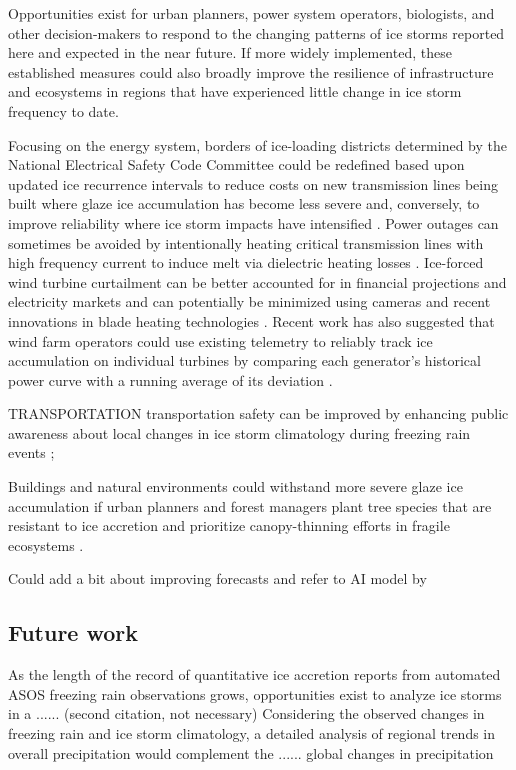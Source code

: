 \documentclass[twocol]{ametsoc}
\begin{document}
Opportunities exist for urban planners, power system operators, biologists, and other decision-makers to respond to the changing patterns of ice storms reported here and expected in the near future. If more widely implemented, these established measures could also broadly improve the resilience of infrastructure and ecosystems in regions that have experienced little change in ice storm frequency to date. 

Focusing on the energy system, borders of ice-loading districts determined by the National Electrical Safety Code Committee could be redefined based upon updated ice recurrence intervals to reduce costs on new transmission lines being built where glaze ice accumulation has become less severe and, conversely, to improve reliability where ice storm impacts have intensified \citep{american2013minimum}. Power outages can sometimes be avoided by intentionally heating critical transmission lines with high frequency current to induce melt via dielectric heating losses \citep{bendel1981review,huneault2005combined,mccurdy2001using}. Ice-forced wind turbine curtailment can be better accounted for in financial projections and electricity markets and can potentially be minimized using cameras and recent innovations in blade heating technologies \citep{bird2014wind}. Recent work has also suggested that wind farm operators could use existing telemetry to reliably track ice accumulation on individual turbines by comparing each generator's historical power curve with a running average of its deviation \citep{davis2016ice}.

TRANSPORTATION 
transportation safety can be improved by enhancing public awareness about local changes in ice storm climatology during freezing rain events \citep{call2009assessment}; 


Buildings and natural environments could withstand more severe glaze ice accumulation if urban planners and forest managers plant tree species that are resistant to ice accretion and prioritize canopy-thinning efforts in fragile ecosystems \citep{hauer2006trees}.

Could add a bit about improving forecasts and refer to AI model by \citet{swaminathan2015modeling}

\subsection{Future work}
As the length of the record of quantitative ice accretion reports from automated ASOS freezing rain observations grows, opportunities exist to analyze ice storms in a ...... \citet{ryerson2007quantitative} (second citation, not necessary)
Considering the observed changes in freezing rain and ice storm climatology, a detailed analysis of regional trends in overall precipitation would complement the ...... global changes in precipitation \citet{westra2013global}
\end{document}
